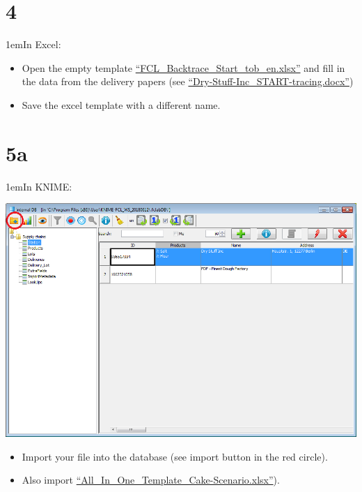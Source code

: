 \documentclass[10pt]{beamer}
\begin{document}
\section{4}
\begin{frame}
\leftskip1em{In Excel:}
	\begin{itemize}
		\item Open the empty template \href{https://foodrisklabs.bfr.bund.de/wp-content/uploads/2015/11/FCL_Backtrace_Start_tob_en.xlsx}{``FCL\_Backtrace\_Start\_tob\_en.xlsx''} and fill in the data from the delivery papers (see \href{https://github.com/SiLeBAT/BfROpenLabResources/raw/master/GitHubPages/documents/FCL_Data_collection_and_import/Dry-Stuff-Inc_START-tracing.docx}{``Dry-Stuff-Inc\_START-tracing.docx''})
		\item Save the excel template with a different name.
	\end{itemize}
\end{frame}

\section{5a}
\begin{frame}
\leftskip1em{In KNIME:}
	\begin{center}
			\includegraphics[height=0.6\textheight]{5a.png}
	\end{center}
	\begin{itemize}
		\item Import your file into the database (see import button in the red circle).
		\item Also import \href{https://github.com/SiLeBAT/BfROpenLabResources/raw/master/GitHubPages/documents/FCL_Data_collection_and_import/All_In_One_Template_Cake-Scenario.xlsx}{``All\_In\_One\_Template\_Cake-Scenario.xlsx''}).
	\end{itemize}
\end{frame}
\end{document}
